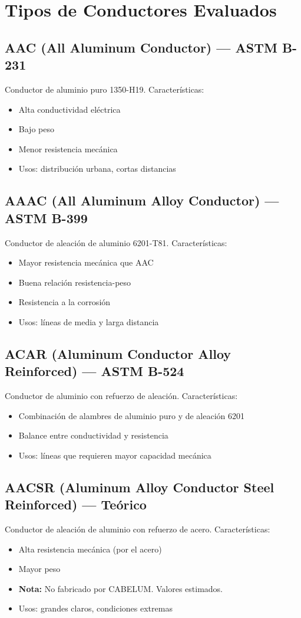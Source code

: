 \documentclass[12pt,a4paper]{article}
\begin{document}
\section{Tipos de Conductores Evaluados}

\subsection{AAC (All Aluminum Conductor) --- ASTM B-231}
Conductor de aluminio puro 1350-H19. Características:
\begin{itemize}
    \item Alta conductividad eléctrica
    \item Bajo peso
    \item Menor resistencia mecánica
    \item Usos: distribución urbana, cortas distancias
\end{itemize}

\subsection{AAAC (All Aluminum Alloy Conductor) --- ASTM B-399}
Conductor de aleación de aluminio 6201-T81. Características:
\begin{itemize}
    \item Mayor resistencia mecánica que AAC
    \item Buena relación resistencia-peso
    \item Resistencia a la corrosión
    \item Usos: líneas de media y larga distancia
\end{itemize}

\subsection{ACAR (Aluminum Conductor Alloy Reinforced) --- ASTM B-524}
Conductor de aluminio con refuerzo de aleación. Características:
\begin{itemize}
    \item Combinación de alambres de aluminio puro y de aleación 6201
    \item Balance entre conductividad y resistencia
    \item Usos: líneas que requieren mayor capacidad mecánica
\end{itemize}

\subsection{AACSR (Aluminum Alloy Conductor Steel Reinforced) --- Teórico}
Conductor de aleación de aluminio con refuerzo de acero. Características:
\begin{itemize}
    \item Alta resistencia mecánica (por el acero)
    \item Mayor peso
    \item \textbf{Nota:} No fabricado por CABELUM. Valores estimados.
    \item Usos: grandes claros, condiciones extremas
\end{itemize}
\end{document}
